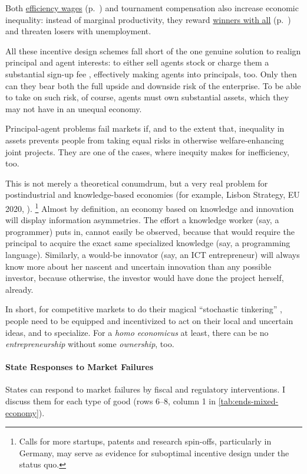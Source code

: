 Both \hyperref[sec:efficiency-wages]{efficiency wages} (p.~\pageref{sec:efficiency-wages}) and tournament compensation also increase economic inequality:
instead of marginal productivity, they reward \hyperref[sec:winner-take-all]{winners with all}  (p.~\pageref{sec:winner-take-all}) and threaten losers with unemployment.

All these incentive design schemes fall short of the one genuine solution to realign principal and agent interests:
to either sell agents stock or charge them a substantial sign-up fee \citep{Tirole2006}, effectively making agents into principals, too.
Only then can they bear both the full upside and downside risk of the enterprise.
To be able to take on such risk, of course, agents must own substantial assets, which they may not have in an unequal economy.

Principal-agent problems fail markets if, and to the extent that, inequality in assets prevents people from taking equal risks in otherwise welfare-enhancing joint projects.
They are one of the cases, where inequity makes for inefficiency, too.

This is not merely a theoretical conumdrum, but a very real problem for postindustrial  and knowledge-based economies (for example, Lisbon Strategy, EU 2020, \citealt{Bell-1973-aa}).
\footnote{
	Calls for more startups, patents and research spin-offs, particularly in Germany, may serve as evidence for suboptimal incentive design under the status quo.
}
Almost by definition, an economy based on knowledge and innovation will display information asymmetries.
The effort a knowledge worker (say, a programmer) puts in, cannot easily be observed, because that would require the principal to acquire the exact same specialized knowledge (say, a programming language).
Similarly, a would-be innovator (say, an \gls{ICT} entrepreneur) will always know more about her nascent and uncertain innovation than any possible investor, because otherwise, the investor would have done the project herself, already.

In short, for competitive markets to do their magical ``stochastic tinkering'' \citep[211]{Taleb2007}, people need to be equipped and incentivized to act on their local and uncertain ideas, and to specialize.
For a \emph{homo economicus} at least, there can be no \emph{entrepreneurship} without some \emph{ownership}, too.


\paragraph{State Responses to Market Failures}
	\label{sec:state-responses}
States can respond to market failures by fiscal and regulatory interventions.
I discuss them for each type of good (rows 6--8, column 1 in \autoref{tab:ends-mixed-economy}).

